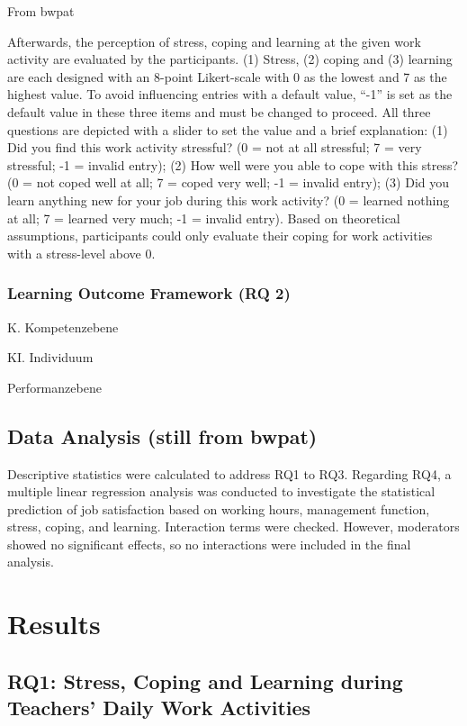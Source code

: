 \documentclass[
]{article}
\begin{document}
From bwpat

Afterwards, the perception of stress, coping and learning at the given
work activity are evaluated by the participants. (1) Stress, (2) coping
and (3) learning are each designed with an 8-point Likert-scale with 0
as the lowest and 7 as the highest value. To avoid influencing entries
with a default value, ``-1'' is set as the default value in these three
items and must be changed to proceed. All three questions are depicted
with a slider to set the value and a brief explanation: (1) Did you find
this work activity stressful? (0 = not at all stressful; 7 = very
stressful; -1 = invalid entry); (2) How well were you able to cope with
this stress? (0 = not coped well at all; 7 = coped very well; -1 =
invalid entry); (3) Did you learn anything new for your job during this
work activity? (0 = learned nothing at all; 7 = learned very much; -1 =
invalid entry). Based on theoretical assumptions, participants could
only evaluate their coping for work activities with a stress-level above
0.

\subsubsection{Learning Outcome Framework (RQ
2)}\label{learning-outcome-framework-rq-2}

K. Kompetenzebene

KI. Individuum

Performanzebene

\subsection{Data Analysis (still from
bwpat)}\label{data-analysis-still-from-bwpat}

Descriptive statistics were calculated to address RQ1 to RQ3. Regarding
RQ4, a multiple linear regression analysis was conducted to investigate
the statistical prediction of job satisfaction based on working hours,
management function, stress, coping, and learning. Interaction terms
were checked. However, moderators showed no significant effects, so no
interactions were included in the final analysis.

\section{Results}\label{results}

\subsection{RQ1: Stress, Coping and Learning during Teachers' Daily Work
Activities}\label{rq1-stress-coping-and-learning-during-teachers-daily-work-activities}
\end{document}
